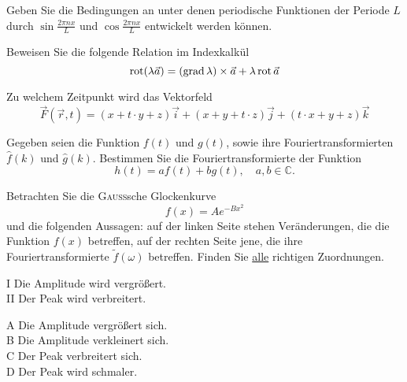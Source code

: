 \documentclass{atistandalonetask}
\begin{document}
\begin{atiTask}[
	title = Weitere Fragen
]
	\providecommand{\D}{\mathrm{d}}

\begin{atiSubtasks}
	\item Geben Sie die Bedingungen an unter denen periodische Funktionen der Periode $L$ durch $\sin \frac{2\pi n x}{L}$ und $\cos \frac{2\pi nx}{L}$ entwickelt werden können.
	\item Beweisen Sie die folgende Relation im Indexkalkül
	\[\operatorname{rot}(\lambda\vec{a})=(\operatorname{grad}\lambda) \times\vec{a}+\lambda\operatorname{rot}\vec{a}
	\]
	\item Zu welchem Zeitpunkt wird das Vektorfeld 
	\[
	\vec{F}(\vec{r},t)=(x+t\cdot y+z)\vec{i}+(x+y+t\cdot z)\vec{j}+(t\cdot x+y+z)\vec{k}
	\]
	\item Gegeben seien die Funktion $f(t)$ und $g(t)$, sowie ihre Fouriertransformierten $\hat{f}(k)$ und $\hat{g}(k)$. Bestimmen Sie die Fouriertransformierte der Funktion 
	\[
	h(t)=af(t)+bg(t),\quad a,b\in \mathbb{C}.
	\]
	\item Betrachten Sie die \textsc{Gauss}sche Glockenkurve
	\[
	f(x)=Ae^{-Bx^2}
	\]
	und die folgenden Aussagen: auf der linken Seite stehen Veränderungen, die die Funktion $f(x)$ betreffen, auf der rechten Seite jene, die ihre Fouriertransformierte $\tilde{f}(\omega)$ betreffen. Finden Sie \underline{alle} richtigen Zuordnungen.\\
	
	\begin{minipage}{6cm}
	I Die Amplitude wird vergrößert.\\
	II Der Peak wird verbreitert.
	\end{minipage}
	\begin{minipage}{6cm}
	A Die Amplitude vergrößert sich.\\
	B Die Amplitude verkleinert sich.\\
	C Der Peak verbreitert sich.\\
	D Der Peak wird schmaler.
	\end{minipage}\\
		
	
\end{atiSubtasks}

\end{atiTask}
\end{document}
